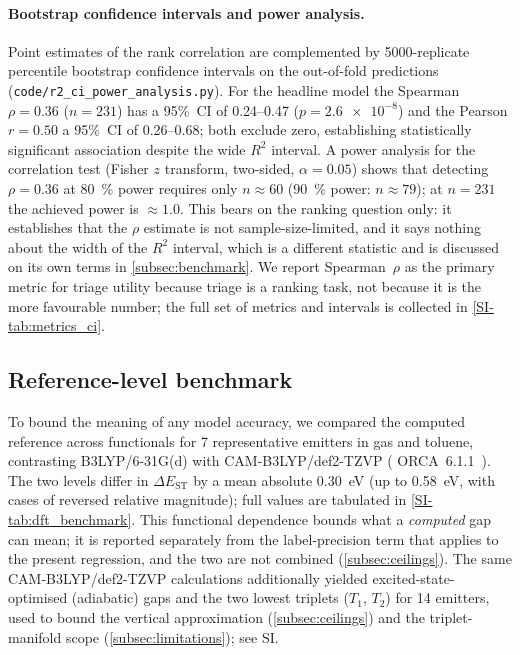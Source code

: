 \paragraph{Bootstrap confidence intervals and power analysis.}
Point estimates of the rank correlation are complemented by
\num{5000}-replicate percentile bootstrap confidence intervals on the
out-of-fold predictions (\texttt{code/r2\_ci\_power\_analysis.py}).
For the headline model the Spearman $\rho = 0.36$ ($n = 231$) has a 95\%~CI of
\numrange{0.24}{0.47} ($p = \num{2.6e-8}$) and the Pearson $r = 0.50$ a 95\%~CI
of \numrange{0.26}{0.68}; both exclude zero, establishing statistically
significant association despite the wide $R^2$ interval.
A power analysis for the correlation test (Fisher $z$ transform, two-sided,
$\alpha = 0.05$) shows that detecting $\rho = 0.36$ at \qty{80}{\percent} power
requires only $n \approx 60$ (\qty{90}{\percent} power: $n \approx 79$); at
$n = 231$ the achieved power is $\approx 1.0$. This bears on the ranking question only:
it establishes that the $\rho$ estimate is not sample-size-limited, and it says nothing
about the width of the $R^2$ interval, which is a different statistic and is discussed on
its own terms in \cref{subsec:benchmark}. We report Spearman~$\rho$ as the primary metric
for triage utility because triage is a ranking task, not because it is the more favourable
number; the full set of metrics and intervals is collected in
\cref{SI-tab:metrics_ci}.

\subsection{Reference-level benchmark}

To bound the meaning of any model accuracy, we compared the computed reference
across functionals for \num{7} representative emitters in gas and toluene,
contrasting B3LYP/6-31G(d) with CAM-B3LYP/def2-TZVP (%
ORCA~6.1.1~\cite{Neese2020}). The two levels differ in $\Delta E_\text{ST}$ by a
mean absolute \qty{0.30}{\electronvolt} (up to \qty{0.58}{\electronvolt}, with
cases of reversed relative magnitude); full values are tabulated in
\cref{SI-tab:dft_benchmark}. This functional dependence bounds what a \emph{computed}
gap can mean; it is reported separately from the label-precision term that applies to
the present regression, and the two are not combined (\cref{subsec:ceilings}). The same CAM-B3LYP/def2-TZVP calculations additionally
yielded excited-state-optimised (adiabatic) gaps and the two lowest triplets
($T_1$, $T_2$) for \num{14} emitters, used to bound the vertical approximation
(\cref{subsec:ceilings}) and the triplet-manifold scope (\cref{subsec:limitations});
see SI.

